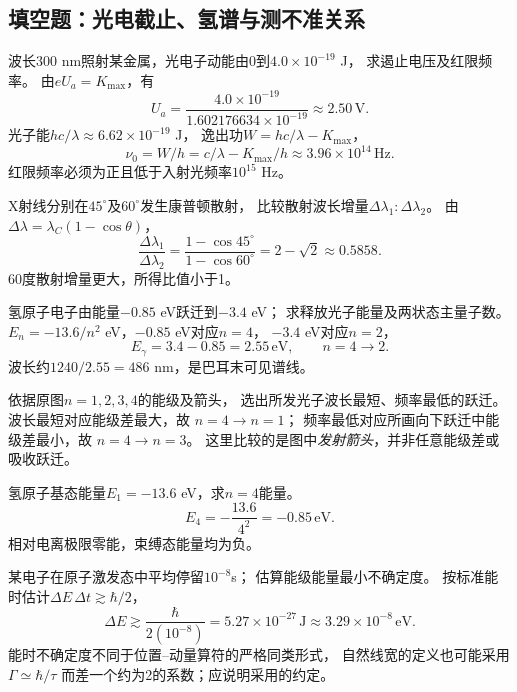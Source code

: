 \subsection{填空题：光电截止、氢谱与测不准关系}

\problemtext 波长300 nm照射某金属，光电子动能由0到$4.0\times10^{-19}$ J，
求遏止电压及红限频率。
\workings
由$eU_a=K_{\max}$，有
\[
\boxed{U_a=\frac{4.0\times10^{-19}}{1.602176634\times10^{-19}}
\approx2.50\,\mathrm V}.
\]
光子能$hc/\lambda\approx6.62\times10^{-19}$ J，
逸出功$W=hc/\lambda-K_{\max}$，
\[
\boxed{\nu_0=W/h
=c/\lambda-K_{\max}/h\approx3.96\times10^{14}\,\mathrm{Hz}}.
\]
\crosscheck 红限频率必须为正且低于入射光频率$10^{15}$ Hz。

\problemtext X射线分别在$45^\circ$及$60^\circ$发生康普顿散射，
比较散射波长增量$\Delta\lambda_1:\Delta\lambda_2$。
\workings
由$\Delta\lambda=\lambda_C(1-\cos\theta)$，
\[
\boxed{\frac{\Delta\lambda_1}{\Delta\lambda_2}
=\frac{1-\cos45^\circ}{1-\cos60^\circ}
=2-\sqrt2\approx0.5858}.
\]
\crosscheck 60度散射增量更大，所得比值小于1。

\problemtext 氢原子电子由能量$-0.85$ eV跃迁到$-3.4$ eV；
求释放光子能量及两状态主量子数。
\workings
$E_n=-13.6/n^2$ eV，$-0.85$ eV对应$n=4$，
$-3.4$ eV对应$n=2$，
\[
\boxed{E_\gamma=3.4-0.85=2.55\,\mathrm{eV}},
\qquad \boxed{n=4\to2}.
\]
\crosscheck 波长约$1240/2.55=486$ nm，是巴耳末可见谱线。

\problemtext 依据原图$n=1,2,3,4$的能级及箭头，
选出所发光子波长最短、频率最低的跃迁。
\workings
波长最短对应能级差最大，故
$\boxed{n=4\to n=1}$；
频率最低对应所画向下跃迁中能级差最小，故
$\boxed{n=4\to n=3}$。
\crosscheck 这里比较的是图中\emph{发射箭头}，并非任意能级差或吸收跃迁。

\problemtext 氢原子基态能量$E_1=-13.6$ eV，求$n=4$能量。
\workings
\[
\boxed{E_4=-\frac{13.6}{4^2}=-0.85\,\mathrm{eV}}.
\]
\crosscheck 相对电离极限零能，束缚态能量均为负。

\problemtext 某电子在原子激发态中平均停留$10^{-8}$s；
估算能级能量最小不确定度。
\workings
按标准能时估计$\Delta E\,\Delta t\gtrsim\hbar/2$，
\[
\boxed{\Delta E\gtrsim\frac{\hbar}{2(10^{-8})}
=5.27\times10^{-27}\,\mathrm J
\approx3.29\times10^{-8}\,\mathrm{eV}}.
\]
\crosscheck 能时不确定度不同于位置--动量算符的严格同类形式，
自然线宽的定义也可能采用$\Gamma\simeq\hbar/\tau$
而差一个约为2的系数；应说明采用的约定。

